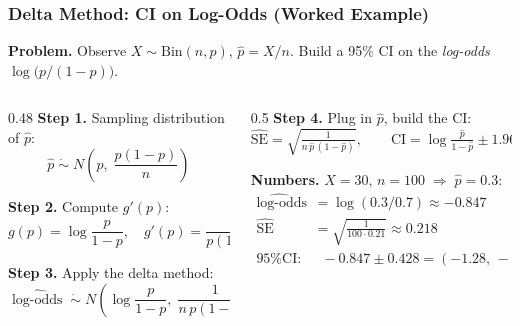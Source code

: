 \documentclass[aspectratio=169]{beamer}
\begin{document}
\begin{frame}
\frametitle{Delta Method: CI on Log-Odds (Worked Example)}

\textbf{Problem.} Observe $X \sim \text{Bin}(n, p)$, $\hat p = X/n$. Build a 95\% CI on the \emph{log-odds} $\log\bigl(p/(1-p)\bigr)$.

\vspace{0.1cm}
\begin{columns}[T]
\begin{column}{0.48\textwidth}
\small
\textbf{Step 1.} Sampling distribution of $\hat p$:
\[
\hat p \;\dot\sim\; N\!\left(p,\; \frac{p(1-p)}{n}\right)
\]

\textbf{Step 2.} Compute $g'(p)$:
\[
g(p) = \log\!\frac{p}{1-p}, \quad g'(p) = \frac{1}{p(1-p)}
\]

\textbf{Step 3.} Apply the delta method:
\[
\widehat{\log\text{-odds}} \;\dot\sim\; N\!\left(\log\!\frac{p}{1-p},\; \frac{1}{n\,p(1-p)}\right)
\]
\end{column}
\begin{column}{0.5\textwidth}
\small
\textbf{Step 4.} Plug in $\hat p$, build the CI:
\[
\widehat{\text{SE}} = \sqrt{\tfrac{1}{n\,\hat p\,(1-\hat p)}}, \qquad \text{CI} = \log\tfrac{\hat p}{1-\hat p} \pm 1.96\,\widehat{\text{SE}}
\]

\textbf{Numbers.} $X = 30,\, n = 100 \;\Rightarrow\; \hat p = 0.3$:
\begin{align*}
\widehat{\log\text{-odds}} &= \log(0.3/0.7) \approx -0.847 \\
\widehat{\text{SE}} &= \sqrt{\tfrac{1}{100 \cdot 0.21}} \approx 0.218 \\
\text{95\% CI:} &\;\;-0.847 \pm 0.428 = (-1.28,\, -0.42)
\end{align*}
\end{column}
\end{columns}

\vspace{0.15cm}
\begin{center}
\end{center}
\end{frame}
\end{document}
